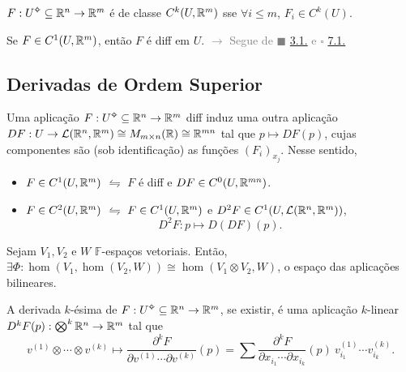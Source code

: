 \Ef

\begin{definition}
    \(F:U\ab\subseteq \R^n\to \R^m\) é de classe \(C^k(U, \mathbb{R}^m)\) sse \(\forall i\leq m\), \(F_i\in C^k(U)\). %
\end{definition}
\begin{corollary}
    Se \(F\in C^1(U,\mathbb{R}^m)\), então \(F\) é diff em \(U\). \textcolor{gray}{\(\rightarrow\) Segue de \(\blacksquare\) \hyperlink{thm31}{3.1.} e {\scriptsize\(\square \)} \hyperlink{lemma71}{7.1.}}
\end{corollary}

\subsection*{Derivadas de Ordem Superior}

\begin{note}
    Uma aplicação \(F:U\ab\subseteq \R^n \to \R^m\) diff induz uma outra aplicação \(DF: U \to \mathcal{L}(\mathbb{R}^n,\mathbb{R}^m)\cong M_{m\times n }(\mathbb{R}) \cong \mathbb{R}^{mn}\) tal que \(p \mapsto DF(p)\), cujas componentes são (sob identificação) as funções \((F_i)_{x_j}\). Nesse sentido,   
    \begin{itemize}
        \item \(F \in C^1(U, \mathbb{R}^m)\) \(\leftrightharpoons\) \(F\) é diff e \(DF \in C^0(U,\mathbb{R}^{mn})\).
        \item \(F \in C^2(U, \mathbb{R}^m)\) \(\leftrightharpoons\) \(F \in C^1(U, \mathbb{R}^m)\) e \(D^2F \in C^1(U, \mathcal{L}(\mathbb{R}^n, \mathbb{R}^m))\), 
        \[D^2F: p \mapsto D (DF) (p).\]
    \end{itemize}
\end{note}

\newcommand{\F}{\mathbb{F}}
\begin{proposition}
    Sejam \(V_1, V_2\) e  \(W\) \(\F\)-espaços vetoriais. Então, \(\exists \Phi : \hom(V_1,\hom(V_2,W)) \cong\hom (V_1\otimes V_2,W)\), o espaço das aplicações bilineares.  
\end{proposition}

\begin{definition}
    A derivada \(k\)-ésima de \(F:U\ab \subseteq \R^n \to \R^m\), se existir, é uma aplicação $k$-linear \(D^kF(p): \bigotimes^k \mathbb{R}^n \to \mathbb{R}^m\) tal que 
    \[v^{(1)}\otimes \cdots \otimes v^{(k)}\mapsto \frac{\partial^k F}{ \partial v^{(1)}\cdots \partial v^{(k)}}(p) = \sum \frac{\partial^k F}{\partial x_{i_1} \cdots \partial x_{i_k}} (p) \ v_{i_1}^{(1)}\cdots v_{i_k}^{(k)}. \]
\end{definition}